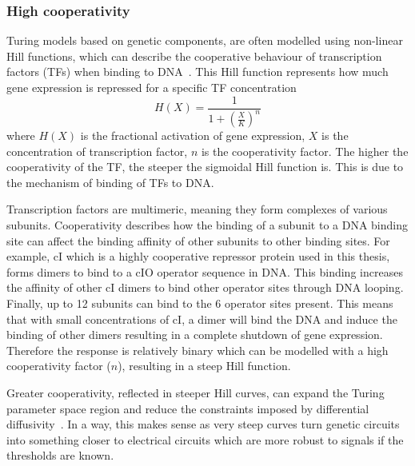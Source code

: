 \subsubsection{High cooperativity}
Turing models based on genetic components, are often modelled using non-linear Hill functions, which can describe the cooperative behaviour of transcription factors (TFs) when binding to DNA~\parencite{Morgunova2017}.
This Hill function represents how much gene expression is repressed for a specific TF concentration
\begin{equation}
    H(X) = \frac{1}{1+(\frac{X}{K})^n}
\end{equation}
where $H(X)$ is the fractional activation of gene expression, $X$ is the concentration of transcription factor, $n$ is the cooperativity factor.
The higher the cooperativity of the TF, the steeper the sigmoidal Hill function is.
This is due to the mechanism of binding of TFs to DNA.

Transcription factors are multimeric, meaning they form complexes of various subunits.
Cooperativity describes how the binding of a subunit to a DNA binding site can affect the binding affinity of other subunits to other binding sites.
For example, cI which is a highly cooperative repressor protein used in this thesis, forms dimers to bind to a cIO operator sequence in DNA.
This binding increases the affinity of other cI dimers to bind other operator sites through DNA looping.
Finally, up to 12 subunits can bind to the 6 operator sites present.
This means that with small concentrations of cI, a dimer will bind the DNA and induce the binding of other dimers resulting in a complete shutdown of gene expression.
Therefore the response is relatively binary which can be modelled with a high cooperativity factor ($n$), resulting in a steep Hill function.


Greater cooperativity, reflected in steeper Hill curves, can expand the Turing parameter space region and reduce the constraints imposed by differential diffusivity~\parencite{Diambra2015a}.
In a way, this makes sense as very steep curves turn genetic circuits into something closer to electrical circuits which are more robust to signals if the thresholds are known.

